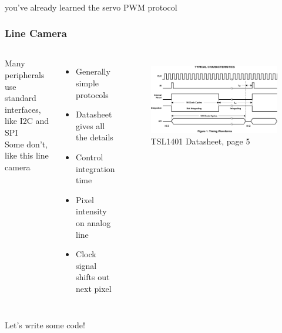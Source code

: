 \documentclass{beamer}
\begin{document}
\begin{frame}
 \\
\hfill \break
you've already learned the servo PWM protocol
\end{frame}

\begin{frame}
\frametitle{Line Camera}
\begin{columns}[t]
  Many peripherals use standard interfaces, like I2C and SPI \\
  \hfill \break
  Some don't, like this line camera
  \begin{itemize}
    \item Generally simple protocols
    \item Datasheet gives all the details
    \item Control integration time
    \item Pixel intensity on analog line
    \item Clock signal shifts out next pixel
  \end{itemize}
  \begin{figure}
    \centering
    \includegraphics[width = 0.9\columnwidth]{external/tsl1401-p5-waveforms} \\
    TSL1401 Datasheet, page 5
  \end{figure}
\end{columns}
\end{frame}

\begin{frame}
\centering \huge Let's write some code!
\end{frame}
\end{document}
